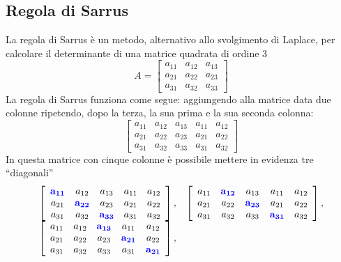 \subsection{Regola di Sarrus}
\label{sec:regsarrus}

La regola di Sarrus è un metodo, alternativo allo svolgimento di Laplace,
per calcolare il determinante di una matrice quadrata di ordine 3
\begin{equation}
  \label{eq:dueintdet5}
  A=
  \begin{bmatrix}
    a_{11}&a_{12} & a_{13}\\
    a_{21} & a_{22} & a_{23}\\
    a_{31} & a_{32} & a_{33}
  \end{bmatrix}
\end{equation}
La regola di Sarrus funziona come segue: aggiungendo alla matrice data due
colonne ripetendo, dopo la terza, la sua prima e la sua seconda colonna:
\begin{equation}
  \label{eq:dueintdet6}
  \left[
  \begin{array}{ccccc}
    a_{11} & a_{12} & a_{13} & a_{11} & a_{12}\\
    a_{21} & a_{22} & a_{23} & a_{21} & a_{22}\\
    a_{31} & a_{32} & a_{33} & a_{31} & a_{32} 
  \end{array}\right]
\end{equation}
In questa matrice con cinque colonne è possibile mettere in evidenza tre
``diagonali''
\begin{equation}
  \label{eq:dueintdet7}
  \begin{matrix}
    \left[
    \begin{array}{ccccc}
      \mathbf{\color{blue}a_{11}} & a_{12} & a_{13} & a_{11} & a_{12}\\
      a_{21} & \mathbf{\color{blue}a_{22}} & a_{23} & a_{21} & a_{22}\\
      a_{31} & a_{32} & \mathbf{\color{blue}a_{33}} & a_{31} & a_{32} 
    \end{array}\right], & \left[
                          \begin{array}{ccccc}
                            a_{11} & \mathbf{\color{blue}a_{12}} & a_{13} & a_{11} & a_{12}\\
                            a_{21} & a_{22} & \mathbf{\color{blue} a_{23}} & a_{21} & a_{22}\\
                            a_{31} & a_{32} & a_{33} & \mathbf{\color{blue} a_{31}} & a_{32} 
                          \end{array}\right],\\ \left[
    \begin{array}{ccccc}
      a_{11} & a_{12} & \mathbf{\color{blue}a_{13}} & a_{11} & a_{12}\\
      a_{21} & a_{22} & a_{23} & \mathbf{\color{blue}a_{21}} & a_{22}\\
      a_{31} & a_{32} & a_{33} & a_{31} & \mathbf{\color{blue}a_{21}} 
    \end{array}\right],
  \end{matrix}
\end{equation}
